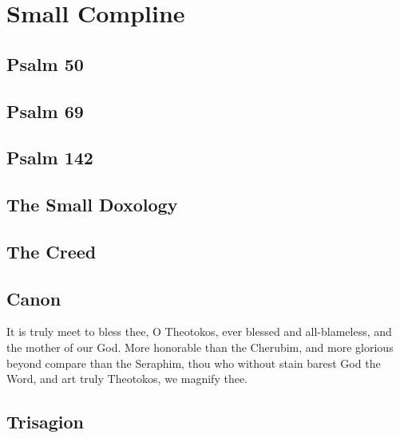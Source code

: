 \section{Small Compline}



\subsection{Psalm 50}



\subsection{Psalm 69}



\subsection{Psalm 142}



\subsection{The Small Doxology}



\subsection{The Creed}



\subsection{Canon}


It is truly meet to bless thee, O Theotokos, ever blessed and all-blameless, and the mother of our God. More honorable than the Cherubim, and more glorious beyond compare than the Seraphim, thou who without stain barest God the Word, and art truly Theotokos, we magnify thee.

\subsection{Trisagion}

